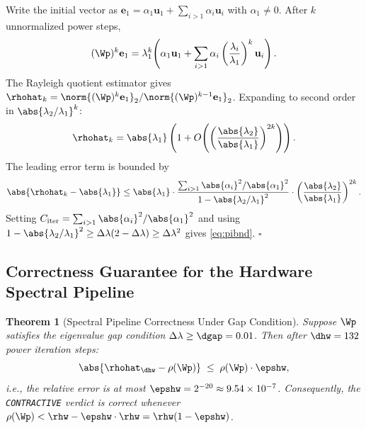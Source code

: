 \documentclass[12pt,letterpaper]{article}
\theoremstyle{plain}
\newtheorem{theorem}{Theorem}[section]
\theoremstyle{definition}
\theoremstyle{remark}
\begin{document}
\begin{proofbox}
Write the initial vector as \(\mathbf{e}_1 = \alpha_1 \mathbf{u}_1 + \sum_{i>1} \alpha_i \mathbf{u}_i\)
with \(\alpha_1 \neq 0\). After \(k\) unnormalized power steps,
\[
  (\Wp)^k \mathbf{e}_1 = \lambda_1^k \!\left(\alpha_1 \mathbf{u}_1
    + \sum_{i>1} \alpha_i \left(\frac{\lambda_i}{\lambda_1}\right)^k \mathbf{u}_i\right).
\]
The Rayleigh quotient estimator gives
\(\rhohat_k = \norm{(\Wp)^k \mathbf{e}_1}_2 / \norm{(\Wp)^{k-1}\mathbf{e}_1}_2\).
Expanding to second order in \(\abs{\lambda_2/\lambda_1}^k\):
\[
  \rhohat_k = \abs{\lambda_1} \left(1 + O\!\left(\left(\frac{\abs{\lambda_2}}{\abs{\lambda_1}}\right)^{2k}\right)\right).
\]
The leading error term is bounded by
\[
  \abs{\rhohat_k - \abs{\lambda_1}}
  \leq \abs{\lambda_1} \cdot \frac{\sum_{i>1}\abs{\alpha_i}^2 / \abs{\alpha_1}^2}
       {1 - \abs{\lambda_2/\lambda_1}^2}
       \cdot \left(\frac{\abs{\lambda_2}}{\abs{\lambda_1}}\right)^{2k}.
\]
Setting \(C_{\mathrm{iter}} = \sum_{i>1}\abs{\alpha_i}^2 / \abs{\alpha_1}^2\)
and using \(1 - \abs{\lambda_2/\lambda_1}^2 \geq \Delta\lambda(2 - \Delta\lambda)
\geq \Delta\lambda^2\) gives \cref{eq:pibnd}. \hfill\(\square\)
\end{proofbox}

\subsection{Correctness Guarantee for the Hardware Spectral Pipeline}

\begin{theorem}[Spectral Pipeline Correctness Under Gap Condition]
\label{thm:correct}
Suppose \(\Wp\) satisfies the eigenvalue gap condition
\(\Delta\lambda \geq \dgap = 0.01\). Then after \(\dhw = 132\) power
iteration steps:
\begin{equation}
  \abs{\rhohat_{\dhw} - \rho(\Wp)}
  \;\leq\;
  \rho(\Wp) \cdot \epshw,
  \label{eq:correct}
\end{equation}
i.e., the relative error is at most \(\epshw = 2^{-20} \approx 9.54 \times 10^{-7}\).
Consequently, the \texttt{CONTRACTIVE} verdict is correct whenever
\(\rho(\Wp) < \rhw - \epshw \cdot \rhw = \rhw(1 - \epshw)\).
\end{theorem}
\end{document}
